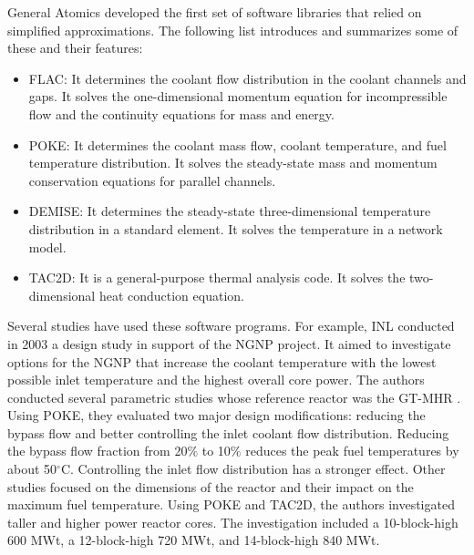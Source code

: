 General Atomics \cite{shenoy_htgr_1974} developed the first set of software libraries that relied on simplified approximations.
The following list introduces and summarizes some of these and their features:

\begin{itemize}
\item FLAC: It determines the coolant flow distribution in the coolant channels and gaps.
It solves the one-dimensional momentum equation for incompressible flow and the continuity equations for mass and energy.

\item POKE: It determines the coolant mass flow, coolant temperature, and fuel temperature distribution.
It solves the steady-state mass and momentum conservation equations for parallel channels.

\item DEMISE: It determines the steady-state three-dimensional temperature distribution in a standard element.
It solves the temperature in a network model.

\item TAC2D: It is a general-purpose thermal analysis code.
It solves the two-dimensional heat conduction equation.
\end{itemize}

Several studies have used these software programs.
For example, \gls{INL} conducted in 2003 a design study \cite{macdonald_ngnp_2003} in support of the \gls{NGNP} project.
It aimed to investigate options for the NGNP that increase the coolant temperature with the lowest possible inlet temperature and the highest overall core power.
The authors conducted several parametric studies whose reference reactor was the GT-MHR \cite{general_atomics_gas_1996}.
Using POKE, they evaluated two major design modifications: reducing the bypass flow and better controlling the inlet coolant flow distribution.
Reducing the bypass flow fraction from 20$\%$ to 10$\%$ reduces the peak fuel temperatures by about 50$^{\circ}$C.
Controlling the inlet flow distribution has a stronger effect.
Other studies focused on the dimensions of the reactor and their impact on the maximum fuel temperature.
Using POKE and TAC2D, the authors investigated taller and higher power reactor cores.
The investigation included a 10-block-high 600 MWt, a 12-block-high 720 MWt, and 14-block-high 840 MWt.

